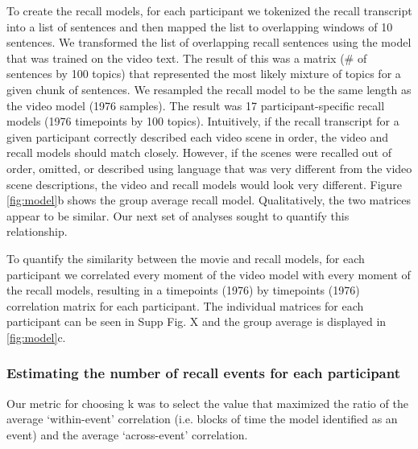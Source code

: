To create the recall models, for each participant we tokenized the recall transcript into a list of sentences and then mapped the list to overlapping windows of 10 sentences.  We transformed the list of overlapping recall sentences using the model that was trained on the video text. The result of this was a matrix (\# of sentences by 100 topics) that represented the most likely mixture of topics for a given chunk of sentences. We resampled the recall model to be the same length as the video model (1976 samples). The result was 17 participant-specific recall models (1976 timepoints by 100 topics). Intuitively, if the recall transcript for a given participant correctly described each video scene in order, the video and recall models should match closely.  However, if the scenes were recalled out of order, omitted, or described using language that was very different from the video scene descriptions, the video and recall models would look very different. Figure \ref{fig:model}b shows the group average recall model. Qualitatively, the two matrices appear to be similar. Our next set of analyses sought to quantify this relationship.

To quantify the similarity between the movie and recall models, for each participant we correlated every moment of the video model with every moment of the recall models, resulting in a timepoints (1976) by timepoints (1976) correlation matrix for each participant.  The individual matrices for each participant can be seen in Supp Fig. X and the group average is displayed in \ref{fig:model}c.

\subsubsection{Estimating the number of recall events for each participant}
Our metric for choosing k was to select the value that maximized the ratio of the average `within-event' correlation (i.e. blocks of time the model identified as an event) and the average `across-event' correlation.

